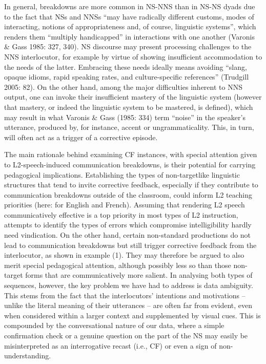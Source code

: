 \documentclass[12pt]{article}
\newenvironment{styleStandard}{\setlength\leftskip{0cm}\setlength\rightskip{0cm plus 1fil}\setlength\parindent{0cm}\setlength\parfillskip{0pt plus 1fil}\setlength\parskip{0cm plus 1pt}\writerlistparindent\writerlistleftskip\leavevmode\normalfont\normalsize\writerlistlabel\ignorespaces}{\unskip\vspace{0cm plus 1pt}\par}
\newenvironment{styleNewparagraph}{\renewcommand\baselinestretch{1.6666666}\setlength\leftskip{0in}\setlength\rightskip{0in plus 1fil}\setlength\parindent{0.5in}\setlength\parfillskip{0pt plus 1fil}\setlength\parskip{0cm plus 1pt}\writerlistparindent\writerlistleftskip\leavevmode\normalfont\normalsize\writerlistlabel\ignorespaces}{\unskip\vspace{0cm plus 1pt}\par}
\newcommand\writerlistleftskip{}
\newcommand\writerlistparindent{}
\newcommand\writerlistlabel{}
\begin{document}
\begin{styleStandard}
In general, breakdowns are more common in NS-NNS than in NS-NS dyads due to the fact that NSs and NNSs “may have radically different customs, modes of interacting, notions of appropriateness and, of course, linguistic systems”, which renders them “multiply handicapped” in interactions with one another (Varonis \& Gass 1985: 327, 340). NS discourse may present processing challenges to the NNS interlocutor, for example by virtue of showing insufficient accommodation to the needs of the latter. Embracing these needs ideally means avoiding “slang, opaque idioms, rapid speaking rates, and culture-specific references” (Trudgill 2005: 82). On the other hand, among the major difficulties inherent to NNS output, one can invoke their insufficient mastery of the linguistic system (however that mastery, or indeed the linguistic system to be mastered, is defined), which may result in what Varonis \& Gass (1985: 334) term “noise” in the speaker’s utterance, produced by, for instance, accent or ungrammaticality. This, in turn, will often act as a trigger of a corrective episode. 
\end{styleStandard}

\begin{styleNewparagraph}
The main rationale behind examining CF instances, with special attention given to L2-speech-induced communication breakdowns, is their potential for carrying pedagogical implications. Establishing the types of non-targetlike linguistic structures that tend to invite corrective feedback, especially if they contribute to communication breakdowns outside of the classroom, could inform L2 teaching priorities (here: for English and French). Assuming that rendering L2 speech communicatively effective is a top priority in most types of L2 instruction, attempts to identify the types of errors which compromise intelligibility hardly need vindication. On the other hand, certain non-standard productions do not lead to communication breakdowns but still trigger corrective feedback from the interlocutor, as shown in example (1). They may therefore be argued to also merit special pedagogical attention, although possibly less so than those non-target forms that are communicatively more salient. In analysing both types of sequences, however, the key problem we have had to address is data ambiguity. This stems from the fact that the interlocutors’ intentions and motivations – unlike the literal meaning of their utterances – are often far from evident, even when considered within a larger context and supplemented by visual cues. This is compounded by the conversational nature of our data, where a simple confirmation check or a genuine question on the part of the NS may easily be misinterpreted as an interrogative recast (i.e., CF) or even a sign of non-understanding.
\end{styleNewparagraph}
\end{document}
